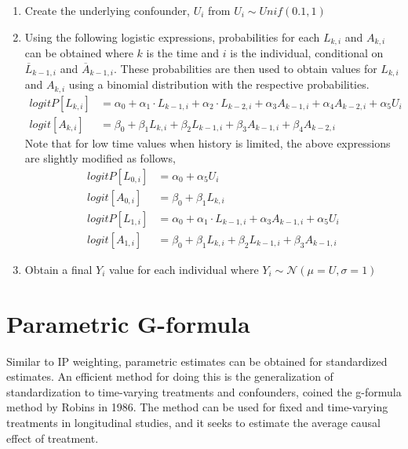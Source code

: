 \begin{enumerate}
\item Create the underlying confounder, $U_i$ from $U_i \sim Unif(0.1, 1)$ 
\item Using the following logistic expressions, probabilities for each $L_{k,i}$ and $A_{k,i}$ can be obtained where $k$ is the time and $i$ is the individual, conditional on $\overline{L}_{k-1,i}$ and $\overline{A}_{k-1,i}$.  These probabilities are then used to obtain values for $L_{k,i}$ and $A_{k,i}$ using a binomial distribution with the respective probabilities.  
\begin{align} 
logitP[L_{k,i}] &= \alpha_0 + \alpha_1 \cdot L_{k-1,i} + \alpha_2 \cdot L_{k-2,i} + \alpha_3 A_{k-1,i} + \alpha_4 A_{k-2,i} + \alpha_5 U_i\\ 
logit[A_{k,i}] &= \beta_0 + \beta_1 L_{k,i} + \beta_2 L_{k-1,i} + \beta_3 A_{k-1,i} + \beta_4 A_{k-2,i}
\end{align} 
Note that for low time values when history is limited, the above expressions are slightly modified as follows, 
\begin{align} 
logitP[L_{0,i}] &= \alpha_0 + \alpha_5 U_i\\ 
logit[A_{0,i}] &= \beta_0 + \beta_1 L_{k,i} \\
logitP[L_{1,i}] &= \alpha_0 + \alpha_1 \cdot L_{k-1,i} + \alpha_3 A_{k-1,i}  + \alpha_5 U_i\\ 
logit[A_{1,i}] &= \beta_0 + \beta_1 L_{k,i} + \beta_2 L_{k-1,i} + \beta_3 A_{k-1,i} 
\end{align} 
\item Obtain a final $Y_i$ value for each individual where $Y_i \sim \mathcal{N}(\mu = U, \sigma = 1)$ 
\end{enumerate} 




\section{Parametric G-formula} 
Similar to IP weighting, parametric estimates can be obtained for standardized estimates.  An efficient method for doing this is the generalization of standardization to time-varying treatments and confounders, coined the g-formula method by Robins in 1986.\cite{robins1986new, wright2015international, hernan_robins_2016}  The method can be used for fixed and time-varying treatments in longitudinal studies, and it seeks to estimate the average causal effect of treatment.  

